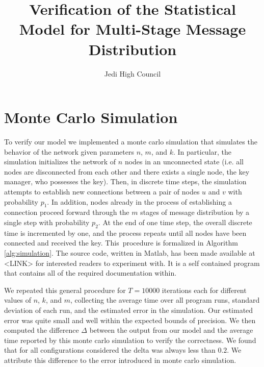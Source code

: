 \documentclass[12pt]{article}
\title{Verification of the Statistical Model for Multi-Stage Message Distribution}
\author{Jedi High Council}
\begin{document}
\maketitle

\section{Monte Carlo Simulation}

To verify our model we implemented a monte carlo simulation that simulates the behavior of the network given parameters $n$, $m$, and $k$. In particular, the simulation initializes the network of $n$ nodes in an unconnected state (i.e. all nodes are disconnected from each other and there exists a single node, the key manager, who possesses the key). Then, in discrete time steps, the simulation attempts to establish new connections between a pair of nodes $u$ and $v$ with probability $p_1$. In addition, nodes already in the process of establishing a connection proceed forward through the $m$ stages of message distribution by a single step with probability $p_2$. At the end of one time step, the overall discrete time is incremented by one, and the process repeats until all nodes have been connected and received the key. This procedure is formalized in Algorithm \ref{alg:simulation}. The source code, written in Matlab, has been made available at <LINK> for interested readers to experiment with. It is a self contained program that contains all of the required documentation within.

We repeated this general procedure for $T = 10000$ iterations each for different values of $n$, $k$, and $m$, collecting the average time over all program runs, standard deviation of each run, and the estimated error in the simulation. Our estimated error was quite small and well within the expected bounds of precision. We then computed the difference $\Delta$ between the output from our model and the average time reported by this monte carlo simulation to verify the correctness. We found that for all configurations considered the delta was always less than $0.2$. We attribute this difference to the error introduced in monte carlo simulation. \\
\end{document}
